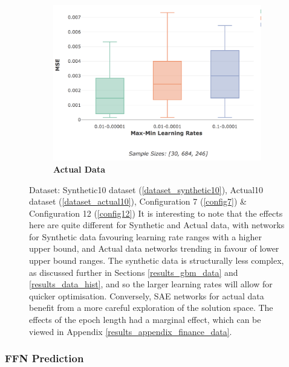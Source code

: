 \documentclass[a4paper,11pt,oneside]{article}
\theoremstyle{plain}
\theoremstyle{definition}
\begin{document}
\begin{figure}[H]
\begin{subfigure}{.5\textwidth}
			\includegraphics[scale=0.3]{images/results/network/lr/actual_mse_minmax_lr.png}
			\caption{\textbf{Actual Data} 
				\newline }
			\label{figure-actual_mse_minmax_lr}
		\end{subfigure}
		\caption[SAE MSE by Learning Rate Schedule Ranges]
		{Dataset: Synthetic10 dataset (\ref{dataset_synthetic10}), Actual10 dataset (\ref{dataset_actual10}), Configuration 7 (\ref{config7}) \& Configuration 12 (\ref{config12})
			\newline It is interesting to  note that the effects here are quite different for Synthetic and Actual data, with networks for Synthetic data favouring learning rate ranges with a higher upper bound, and Actual data networks trending in favour of lower upper bound ranges. The synthetic data is structurally less complex, as discussed further in Sections \ref{results_gbm_data} and \ref{results_data_hist}, and so the larger learning rates will allow for quicker optimisation. Conversely, SAE networks for actual data benefit from a more careful exploration of the solution space. The effects of the epoch length had a marginal effect, which can be viewed in Appendix \ref{results_appendix_finance_data}.}
		\label{figure-mse_lr}
	\end{figure}

	

	

	
	
	
	
	
	
	
	
	\newpage
	\subsubsection{FFN Prediction}
	
\end{document}
